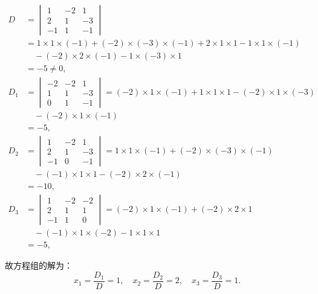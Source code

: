 \begin{solution}
\begin{align*}
D & = \begin{vmatrix} 1 & -2 & 1 \\ 2 & 1 & -3 \\ -1 & 1 & -1 \end{vmatrix} \\
& = 1\times 1\times (-1) + (-2)\times (-3)\times (-1) + 2\times 1\times 1 - 1\times 1\times (-1) \\
& \quad - (-2)\times 2\times (-1) - 1\times (-3)\times 1 \\
& = -5 \neq 0, \\
D_1 & = \begin{vmatrix} -2 & -2 & 1 \\ 1 & 1 & -3 \\ 0 & 1 & -1 \end{vmatrix} = (-2)\times 1\times (-1) + 1\times 1\times 1 - (-2)\times 1\times (-3) \\
& \quad - (-2)\times 1\times (-1) \\
& = -5, \\
D_2 & = \begin{vmatrix} 1 & -2 & 1 \\ 2 & 1 & -3 \\ -1 & 0 & -1 \end{vmatrix}
= 1\times 1\times (-1) + (-2)\times (-3)\times (-1) \\
& \quad - (-1)\times 1\times 1 - (-2)\times 2\times (-1) \\
& = -10, \\
D_3 & = \begin{vmatrix} 1 & -2 & -2 \\ 2 & 1 & 1 \\ -1 & 1 & 0 \end{vmatrix}
 = (-2)\times 1\times (-1) + (-2)\times 2\times 1 \\
& \quad - (-1)\times 1\times (-2) - 1\times 1\times 1 \\
& = -5,
\end{align*}

故方程组的解为：
$$x_1 = \frac{D_1}{D} = 1, \quad x_2 = \frac{D_2}{D} = 2, \quad x_3 = \frac{D_3}{D} = 1.$$
\end{solution}

\vspace{1.5em}


